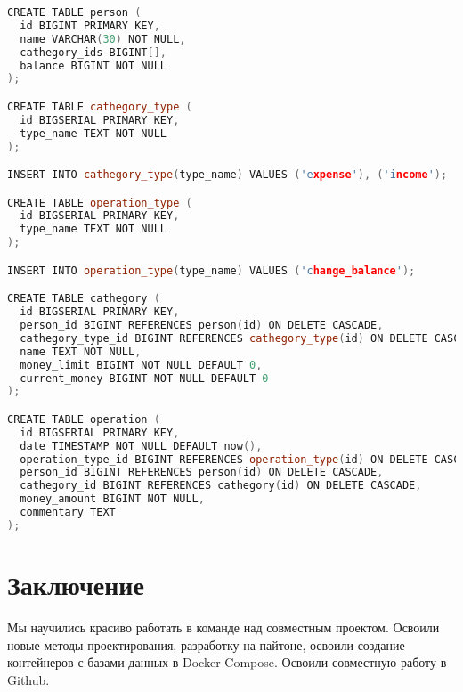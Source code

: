 \documentclass[12pt]{extarticle}
\begin{document}
\begin{lstlisting}[language=C++,style=mystyle,caption=class ReturningResultHandler]
CREATE TABLE person (
  id BIGINT PRIMARY KEY,
  name VARCHAR(30) NOT NULL,
  cathegory_ids BIGINT[],
  balance BIGINT NOT NULL
);

CREATE TABLE cathegory_type (
  id BIGSERIAL PRIMARY KEY,
  type_name TEXT NOT NULL
);

INSERT INTO cathegory_type(type_name) VALUES ('expense'), ('income');

CREATE TABLE operation_type (
  id BIGSERIAL PRIMARY KEY,
  type_name TEXT NOT NULL
);

INSERT INTO operation_type(type_name) VALUES ('change_balance');

CREATE TABLE cathegory (
  id BIGSERIAL PRIMARY KEY,
  person_id BIGINT REFERENCES person(id) ON DELETE CASCADE,
  cathegory_type_id BIGINT REFERENCES cathegory_type(id) ON DELETE CASCADE,
  name TEXT NOT NULL,
  money_limit BIGINT NOT NULL DEFAULT 0,
  current_money BIGINT NOT NULL DEFAULT 0
);

CREATE TABLE operation (
  id BIGSERIAL PRIMARY KEY,
  date TIMESTAMP NOT NULL DEFAULT now(),
  operation_type_id BIGINT REFERENCES operation_type(id) ON DELETE CASCADE,
  person_id BIGINT REFERENCES person(id) ON DELETE CASCADE,
  cathegory_id BIGINT REFERENCES cathegory(id) ON DELETE CASCADE,
  money_amount BIGINT NOT NULL,
  commentary TEXT
);
\end{lstlisting}

\pagebreak

\section{Заключение}
Мы научились красиво работать в команде над совместным проектом. Освоили новые методы проектирования, разработку на пайтоне, освоили создание контейнеров с базами данных в Docker Compose. Освоили совместную работу в Github.
\end{document}
